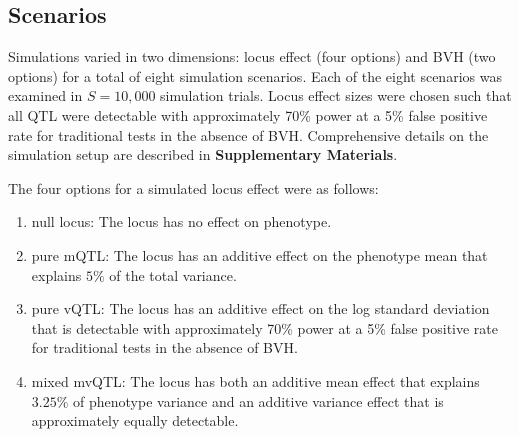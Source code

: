 \subsection{Scenarios}

Simulations varied in two dimensions: locus effect (four options) and BVH (two options) for a total of eight simulation scenarios.
Each of the eight scenarios was examined in $S = 10,000$ simulation trials.
Locus effect sizes were chosen such that all QTL were detectable with approximately 70\% power at a 5\% false positive rate for traditional tests in the absence of BVH.
Comprehensive details on the simulation setup are described in \textbf{Supplementary Materials}.

The four options for a simulated locus effect were as follows:
\begin{enumerate}
    \item null locus: The locus has no effect on phenotype.
    \item pure mQTL: The locus has an additive effect on the phenotype mean that explains $5\%$ of the total variance.
    \item pure vQTL: The locus has an additive effect on the log standard deviation that is detectable with approximately 70\% power at a 5\% false positive rate for traditional tests in the absence of BVH. %
    \item mixed mvQTL: The locus has both an additive mean effect that explains $3.25\%$ of phenotype variance and an additive variance effect that is approximately equally detectable.
\end{enumerate}
